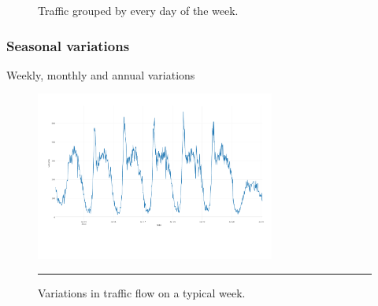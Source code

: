 \begin{figure}[h]
    \qquad


    \caption[Traffic grouped by every day of the week]{Traffic grouped by every day of the week.}
    \label{fig:TypicalDayTraffic}
\end{figure}

\subsubsection{Seasonal variations}

Weekly, monthly and annual variations

\begin{figure}[h]
   \centering
    \includegraphics[width=0.7\textwidth,height=0.7\textheight,keepaspectratio]{Plots/typical-week.pdf}
    \rule{35em}{0.5pt}
  \caption[A typical week traffic flow]{Variations in traffic flow on a typical week.}
  \label{fig:TypicalWeek}
\end{figure}

